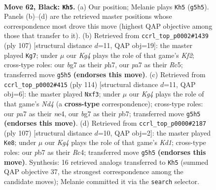 \documentclass[11pt]{article}
\begin{document}
\clearpage

\begin{figure}[p]\centering
\begin{subfigure}{0.46\textwidth}\centering
\resizebox{\linewidth}{!}{%
\newchessgame
\chessboard[
  setfen={8/PP4B1/5R2/6k1/3K4/8/8/8 b - - 0 62},
  showmover=false,
  pgfstyle=straightmove, color=movearrow, markmove={g5-h5}
]}
\caption{}
\end{subfigure}\hfill
\begin{subfigure}{0.46\textwidth}\centering
\resizebox{\linewidth}{!}{%
\newchessgame
\chessboard[
  setfen={8/5k1P/4R3/2r5/5P1K/8/8/8 b - - 0 54},
  showmover=false,
  pgfstyle=straightmove, color=movearrow, markmove={f7-g7}
]}
\caption{}
\end{subfigure}
\\[4pt]
\begin{subfigure}{0.46\textwidth}\centering
\resizebox{\linewidth}{!}{%
\newchessgame
\chessboard[
  setfen={8/1p6/6k1/8/3Nn3/5r2/7K/8 w - - 0 58},
  showmover=false,
  pgfstyle=straightmove, color=movearrow, markmove={d4-f3}
]}
\caption{}
\end{subfigure}\hfill
\begin{subfigure}{0.46\textwidth}\centering
\resizebox{\linewidth}{!}{%
\newchessgame
\chessboard[
  setfen={3k4/3R4/p7/5B2/2r5/4K3/8/8 b - - 2 54},
  showmover=false,
  pgfstyle=straightmove, color=movearrow, markmove={d8-e8}
]}
\caption{}
\end{subfigure}
\caption{\textbf{Move 62, Black: \texttt{Kh5}.} (a) Our position; Melanie plays \texttt{Kh5} (\texttt{g5h5}). Panels (b)--(d) are the retrieved master positions whose correspondence most drove this move (highest QAP objective among those that transfer to it). (b) Retrieved from \texttt{ccrl\_top\_p0002\#1439} (ply 107) [structural distance $d$=11, QAP obj=19]: the master played \texttt{Kg7}; under $\mu$ our \emph{Kg4} plays the role of that game's \emph{Kf2}; cross-type roles: our \emph{b}g7 as their \emph{p}h7, our \emph{p}a7 as their \emph{R}c5; transferred move \texttt{g5h5} \textbf{(endorses this move)}. (c) Retrieved from \texttt{ccrl\_top\_p0002\#415} (ply 114) [structural distance $d$=11, QAP obj=6]: the master played \texttt{Nxf3}; under $\mu$ our \emph{Kg4} plays the role of that game's \emph{Nd4} (a \textbf{cross-type} correspondence); cross-type roles: our \emph{p}a7 as their \emph{n}e4, our \emph{b}g7 as their \emph{p}b7; transferred move \texttt{g5h5} \textbf{(endorses this move)}. (d) Retrieved from \texttt{ccrl\_top\_p0000\#2187} (ply 107) [structural distance $d$=10, QAP obj=2]: the master played \texttt{Ke8}; under $\mu$ our \emph{Kg4} plays the role of that game's \emph{Kd1}; cross-type roles: our \emph{p}b7 as their \emph{R}c4; transferred move \texttt{g5h5} \textbf{(endorses this move)}. Synthesis: 16 retrieved analogs transferred to \texttt{Kh5} (summed QAP objective 37, the strongest correspondence among the candidate moves); Melanie committed it via the \texttt{search} selector.}
\label{fig:thought-m123}
\end{figure}
\end{document}
